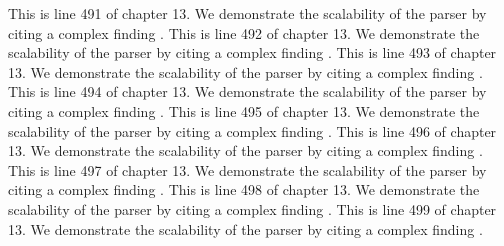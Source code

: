 This is line 491 of chapter 13. We demonstrate the scalability of the parser by citing a complex finding \cite{ref13_491}.
This is line 492 of chapter 13. We demonstrate the scalability of the parser by citing a complex finding \cite{ref13_492}.
This is line 493 of chapter 13. We demonstrate the scalability of the parser by citing a complex finding \cite{ref13_493}.
This is line 494 of chapter 13. We demonstrate the scalability of the parser by citing a complex finding \cite{ref13_494}.
This is line 495 of chapter 13. We demonstrate the scalability of the parser by citing a complex finding \cite{ref13_495}.
This is line 496 of chapter 13. We demonstrate the scalability of the parser by citing a complex finding \cite{ref13_496}.
This is line 497 of chapter 13. We demonstrate the scalability of the parser by citing a complex finding \cite{ref13_497}.
This is line 498 of chapter 13. We demonstrate the scalability of the parser by citing a complex finding \cite{ref13_498}.
This is line 499 of chapter 13. We demonstrate the scalability of the parser by citing a complex finding \cite{ref13_499}.
